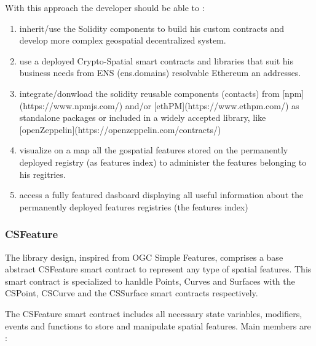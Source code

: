 \documentclass{isprs} %
\begin{document}
With this approach the developer should be able to : 

\begin{enumerate}
\setlength\itemsep{0em}\setlength\parskip{0em}\setlength\topsep{0em}\setlength\partopsep{0em}\setlength\parsep{0em} 
\item{inherit/use the Solidity components to build his custom contracts and develop more complex geospatial decentralized system.} 
\item{use a deployed Crypto-Spatial smart contracts and libraries that suit his business needs from ENS (ens.domains) resolvable Ethereum an addresses.}
\item{integrate/donwload the solidity reusable components (contacts) from [npm](https://www.npmjs.com/) and/or [ethPM](https://www.ethpm.com/) as standalone packages or included in a widely accepted library, like [openZeppelin](https://openzeppelin.com/contracts/)}
\item{visualize on a map all the gospatial features stored on the permanently deployed registry (as features index) to administer the features belonging to his regitries.}
\item{access a fully featured dasboard displaying all useful information about the permanently deployed features registries (the features index)}
\end{enumerate}

\subsubsection{CSFeature}\label{sec:CSFeature}

The library design, inspired from OGC Simple Features, comprises a base abstract CSFeature smart contract to represent any type of spatial features. This smart contract is specialized to hanldle Points, Curves and Surfaces with the CSPoint, CSCurve and the CSSurface smart contracts respectively.

The CSFeature smart contract includes all necessary state variables, modifiers, events and functions to store and manipulate spatial features. Main members are :
\end{document}
